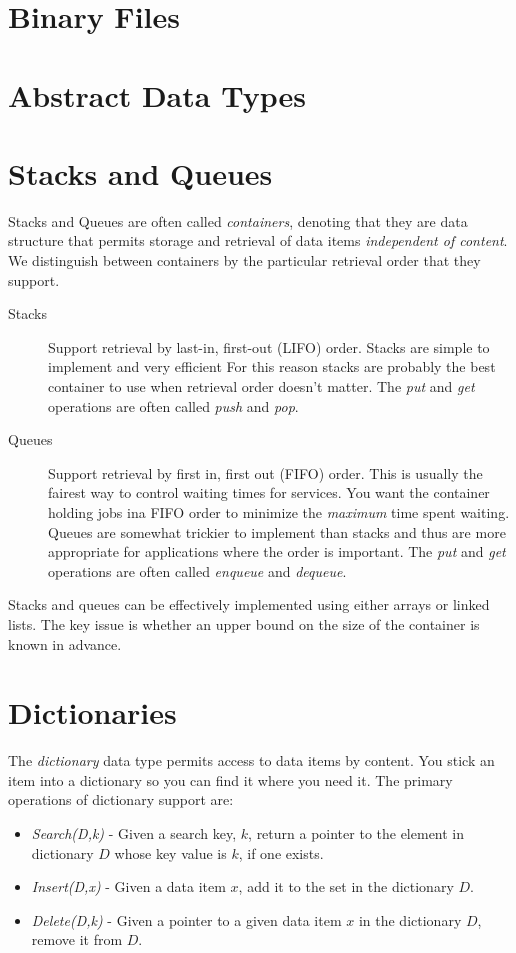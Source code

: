 	\section{Binary Files}
\section{Abstract Data Types}
\section{Stacks and Queues}
	Stacks and Queues are often called \textit{containers}, denoting that they are data structure that permits storage and retrieval of data items \textit{independent of content}. We distinguish between containers by the particular retrieval order that they support.
	\begin{description}
		\item[Stacks] Support retrieval by last-in, first-out (LIFO) order. Stacks are simple to implement and very efficient For this reason stacks are probably the best container to use when retrieval order doesn't matter. The \textit{put} and \textit{get} operations are often called \textit{push} and \textit{pop}.
		\item[Queues] Support retrieval by first in, first out (FIFO) order. This is usually the fairest way to control waiting times for services. You want the container holding jobs ina FIFO order to minimize the \textit{maximum} time spent waiting. Queues are somewhat trickier to implement than stacks and thus are more appropriate for applications where the order is important. The \textit{put} and \textit{get} operations are often called \textit{enqueue} and \textit{dequeue}.
	\end{description}

	Stacks and queues can be effectively implemented using either arrays or linked lists. The key issue is whether an upper bound on the size of the container is known in advance.

\section{Dictionaries}
	The \textit{dictionary} data type permits access to data items by content. You stick an item into a dictionary so you can find it where you need it. The primary operations of dictionary support are:
	\begin{itemize}
		\item \textit{Search(D,k)} - Given a search key, $k$, return a pointer to the element in dictionary $D$ whose key value is $k$, if one exists.
		\item \textit{Insert(D,x)} - Given a data item $x$, add it to the set in the dictionary $D$.
		\item \textit{Delete(D,k)} - Given a pointer to a given data item $x$ in the dictionary $D$, remove it from $D$.
	\end{itemize}

